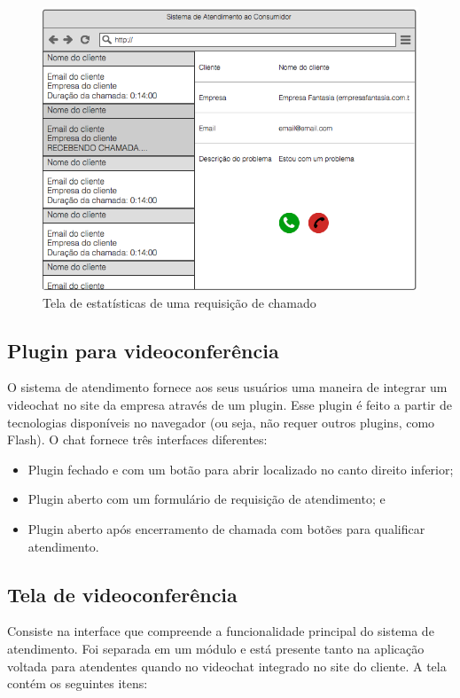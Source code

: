 \begin{figure}[ht!]
	\centering
    \includegraphics[scale=0.4]{figures/prototypes/call-statistics.png} 
	\caption{Tela de estatísticas de uma requisição de chamado}
	\label{fig:call_statistics}
\end{figure}

\subsection{Plugin para videoconferência}

O sistema de atendimento fornece aos seus usuários uma maneira de integrar um videochat no site da empresa através de um plugin. Esse plugin é feito a partir de tecnologias disponíveis no navegador (ou seja, não requer outros plugins, como Flash). O chat fornece três interfaces diferentes:

\begin{itemize}
  \item Plugin fechado e com um botão para abrir localizado no canto direito inferior;
  \item Plugin aberto com um formulário de requisição de atendimento; e
  \item Plugin aberto após encerramento de chamada com botões para qualificar atendimento.
\end{itemize}

\subsection{Tela de videoconferência}

Consiste na interface que compreende a funcionalidade principal do sistema de atendimento. Foi separada em um módulo e está presente tanto na aplicação voltada para atendentes quando no videochat integrado no site do cliente. A tela contém os seguintes itens:

